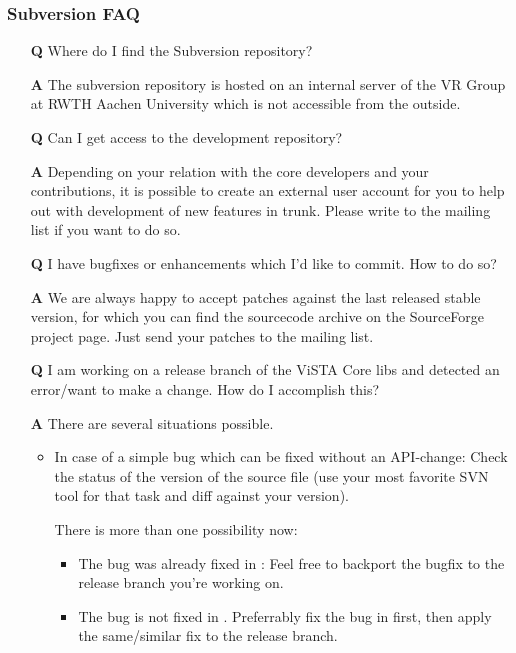 \subsubsection{Subversion FAQ}

\begin{itemize}

\item[\textbf{Q}] Where do I find the Subversion repository?
\item[\textbf{A}] The subversion repository is hosted on an internal server of the VR Group at RWTH Aachen University which is not accessible from the outside.

\item[\textbf{Q}] Can I get access to the development repository?
\item[\textbf{A}] Depending on your relation with the core developers and your contributions, it is possible to create an external user account for you to help out with development of new features in trunk. Please write to the mailing list if you want to do so.

\item[\textbf{Q}] I have bugfixes or enhancements which I'd like to commit. How to do so?
\item[\textbf{A}] We are always happy to accept patches against the last released stable version, for which you can find the sourcecode archive on the SourceForge project page. Just send your patches to the mailing list.

\item[\textbf{Q}] I am working on a release branch of the ViSTA Core libs and detected an error/want to make a change.
  How do I accomplish this?
\item[\textbf{A}] There are several situations possible.

  \begin{itemize}
  \item In case of a simple bug which can be fixed without an API-change:
	Check the status of the  version of the source file (use your most favorite SVN tool for that task and diff against your version).

	There is more than one possibility now:
	\begin{itemize}
	\item The bug was already fixed in :
      Feel free to backport the bugfix to the release branch you're working on.
    \item The bug is not fixed in .
	  Preferrably fix the bug in  first, then apply the same/similar fix to the release branch.
	\end{itemize}
	

\end{itemize}
\end{itemize}
